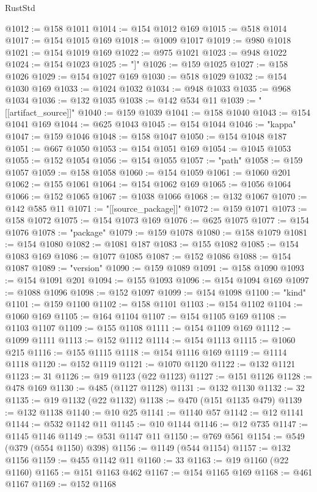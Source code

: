 \begin{lexlean}{RustStd}
\begin{coremodule}
@1012 := @158 @1011
@1014 := @154 @1012 @169
@1015 := @518 @1014
@1017 := @154 @1015 @169
@1018 := @1009 @1017
@1019 := @980 @1018
@1021 := @154 @1019 @169
@1022 := @975 @1021
@1023 := @948 @1022
@1024 := @154 @1023
@1025 := "]"
@1026 := @159 @1025
@1027 := @158 @1026
@1029 := @154 @1027 @169
@1030 := @518 @1029
@1032 := @154 @1030 @169
@1033 := @1024 @1032
@1034 := @948 @1033
@1035 := @968 @1034
@1036 := @132 @1035
@1038 := @142 @534 @11
@1039 := "[[artifact_source]]"
@1040 := @159 @1039
@1041 := @158 @1040
@1043 := @154 @1041 @169
@1044 := @625 @1043
@1045 := @154 @1044
@1046 := "kappa"
@1047 := @159 @1046
@1048 := @158 @1047
@1050 := @154 @1048 @187
@1051 := @667 @1050
@1053 := @154 @1051 @169
@1054 := @1045 @1053
@1055 := @152 @1054
@1056 := @154 @1055
@1057 := "path"
@1058 := @159 @1057
@1059 := @158 @1058
@1060 := @154 @1059
@1061 := @1060 @201
@1062 := @155 @1061
@1064 := @154 @1062 @169
@1065 := @1056 @1064
@1066 := @152 @1065
@1067 := @1038 @1066
@1068 := @132 @1067
@1070 := @142 @585 @11
@1071 := "[[source_package]]"
@1072 := @159 @1071
@1073 := @158 @1072
@1075 := @154 @1073 @169
@1076 := @625 @1075
@1077 := @154 @1076
@1078 := "package"
@1079 := @159 @1078
@1080 := @158 @1079
@1081 := @154 @1080
@1082 := @1081 @187
@1083 := @155 @1082
@1085 := @154 @1083 @169
@1086 := @1077 @1085
@1087 := @152 @1086
@1088 := @154 @1087
@1089 := "version"
@1090 := @159 @1089
@1091 := @158 @1090
@1093 := @154 @1091 @201
@1094 := @155 @1093
@1096 := @154 @1094 @169
@1097 := @1088 @1096
@1098 := @152 @1097
@1099 := @154 @1098
@1100 := "kind"
@1101 := @159 @1100
@1102 := @158 @1101
@1103 := @154 @1102
@1104 := @1060 @169
@1105 := @164 @1104
@1107 := @154 @1105 @169
@1108 := @1103 @1107
@1109 := @155 @1108
@1111 := @154 @1109 @169
@1112 := @1099 @1111
@1113 := @152 @1112
@1114 := @154 @1113
@1115 := @1060 @215
@1116 := @155 @1115
@1118 := @154 @1116 @169
@1119 := @1114 @1118
@1120 := @152 @1119
@1121 := @1070 @1120
@1122 := @132 @1121
@1123 := 31
@1126 := @19 @1123 (@22 @1123)
@1127 := @151 @1126
@1128 := @478 @169
@1130 := @485 (@1127 @1128)
@1131 := @132 @1130
@1132 := 32
@1135 := @19 @1132 (@22 @1132)
@1138 := @470 (@151 @1135 @479)
@1139 := @132 @1138
@1140 := @10 @25
@1141 := @1140 @57
@1142 := @12 @1141
@1144 := @532 @1142 @11
@1145 := @10 @1144
@1146 := @12 @735
@1147 := @1145 @1146
@1149 := @531 @1147 @11
@1150 := @769 @561
@1154 := @549 (@379 (@554 @1150) @398)
@1156 := @1149 (@544 @1154)
@1157 := @132 @1156
@1159 := @455 @1142 @11
@1160 := 33
@1163 := @19 @1160 (@22 @1160)
@1165 := @151 @1163 @462
@1167 := @154 @1165 @169
@1168 := @461 @1167
@1169 := @152 @1168

\end{coremodule}
\end{lexlean}

